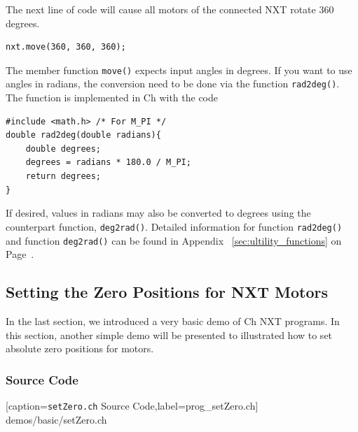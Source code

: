 \documentclass[11pt]{article}
\begin{document}
The next line of code will cause all motors of the connected NXT rotate 360 degrees.
\begin{lstlisting}
nxt.move(360, 360, 360);
\end{lstlisting}
The member function {\tt move()} expects input angles in degrees. If you want to 
use angles in radians, the conversion need to be done via the function {\tt rad2deg()}. 
The function is implemented in Ch with the code
\begin{lstlisting}
#include <math.h> /* For M_PI */
double rad2deg(double radians){
    double degrees;
    degrees = radians * 180.0 / M_PI;
    return degrees;
}
\end{lstlisting}
If desired, values in radians may also be converted to degrees using the 
counterpart function, {\tt deg2rad()}. Detailed information for function 
{\tt rad2deg()} and function {\tt deg2rad()} can be found in Appendix~
\ref{sec:ultility_functions} on Page~\pageref{sec:ultility_functions}.\\

\subsection{\label{sec:setzero_demo}Setting the Zero Positions for NXT Motors}
In the last section, we introduced a very basic demo of Ch NXT programs. In this 
section, another simple demo will be presented to illustrated how to set absolute 
zero positions for motors.

\subsubsection*{Source Code}

    [caption={{\tt setZero.ch} Source Code},label=prog_setZero.ch]
    {demos/basic/setZero.ch}
\end{document}

